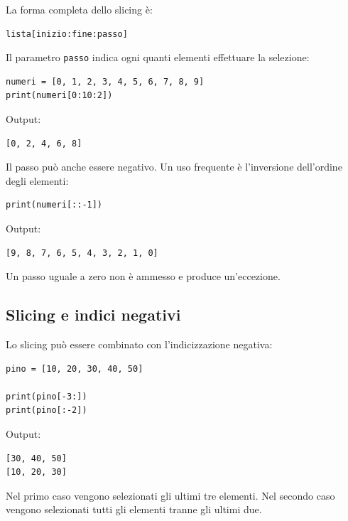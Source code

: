 \documentclass[11pt,a4paper]{book}
\begin{document}
La forma completa dello slicing è:

\begin{lstlisting}[style=python, numbers=none]
lista[inizio:fine:passo]
\end{lstlisting}

Il parametro \texttt{passo} indica ogni quanti elementi effettuare la selezione:

\begin{lstlisting}[style=python]
numeri = [0, 1, 2, 3, 4, 5, 6, 7, 8, 9]
print(numeri[0:10:2])
\end{lstlisting}

Output:

\begin{lstlisting}[style=python, numbers=none]
[0, 2, 4, 6, 8]
\end{lstlisting}

Il passo può anche essere negativo. Un uso frequente è l'inversione dell'ordine degli elementi:

\begin{lstlisting}[style=python]
print(numeri[::-1])
\end{lstlisting}

Output:

\begin{lstlisting}[style=python, numbers=none]
[9, 8, 7, 6, 5, 4, 3, 2, 1, 0]
\end{lstlisting}

Un passo uguale a zero non è ammesso e produce un'eccezione.

\subsection{Slicing e indici negativi}

Lo slicing può essere combinato con l'indicizzazione negativa:

\begin{lstlisting}[style=python]
pino = [10, 20, 30, 40, 50]

print(pino[-3:])
print(pino[:-2])
\end{lstlisting}

Output:

\begin{lstlisting}[style=python, numbers=none]
[30, 40, 50]
[10, 20, 30]
\end{lstlisting}

Nel primo caso vengono selezionati gli ultimi tre elementi. Nel secondo caso vengono selezionati tutti gli elementi tranne gli ultimi due.
\end{document}
